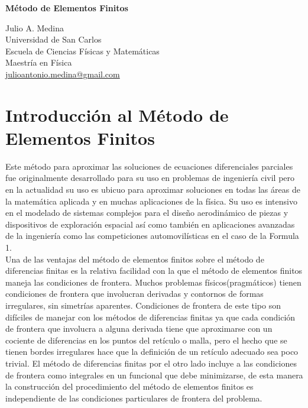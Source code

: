 \documentclass[a4paper]{article}
\begin{document}

\Large
 \begin{center}
\textbf{Método de Elementos Finitos}\\


\hspace{10pt}

\large
Julio A. Medina\\
\hspace{10pt}
\small  
Universidad de San Carlos\\
Escuela de Ciencias Físicas y Matemáticas\\
Maestría en Física\\
\href{mailto:julioantonio.medina@gmail.com}{julioantonio.medina@gmail.com}\\

\end{center}

\hspace{10pt}

\normalsize
\section{Introducción al Método de Elementos Finitos}
Este método para aproximar las soluciones de ecuaciones diferenciales parciales fue originalmente desarrollado para su uso en problemas de ingeniería civil pero en la actualidad su uso es ubicuo para aproximar soluciones en todas las áreas de la matemática aplicada y en muchas aplicaciones de la física. Su uso es intensivo en el modelado de sistemas complejos para el diseño aerodinámico de piezas y dispositivos de exploración espacial así como también en aplicaciones avanzadas de la ingeniería como las competiciones automovilísticas en el caso de la Formula 1. \\ 

Una de las ventajas del método de elementos finitos sobre el método de diferencias finitas es la relativa facilidad con la que el método de elementos finitos maneja las condiciones de frontera. Muchos problemas físicos(pragmáticos) tienen condiciones de frontera que involucran derivadas y contornos de formas irregulares, sin simetrías aparentes. Condiciones de frontera de este tipo son difíciles de manejar con los métodos de diferencias finitas ya que cada condición de frontera que involucra a alguna derivada tiene que aproximarse con un cociente de diferencias en los puntos del retículo o malla, pero el hecho que se tienen bordes irregulares hace que la definición de un retículo adecuado sea poco trivial. El método de diferencias finitas por el otro lado incluye a las condiciones de frontera como integrales en un funcional que debe minimizarse, de esta manera la construcción del procedimiento del método de elementos finitos es independiente de las condiciones particulares de frontera del problema.\\
\end{document}
